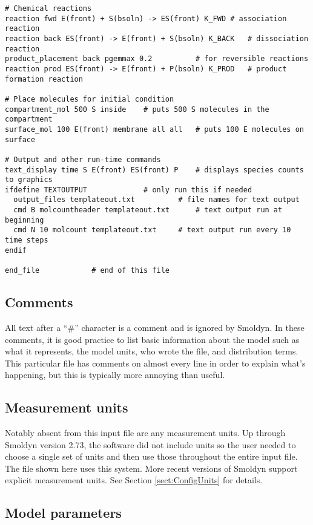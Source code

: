 \documentclass {scrbook}
\begin{document}
\begin{lstlisting}[style=SSAC]
# Chemical reactions
reaction fwd E(front) + S(bsoln) -> ES(front) K_FWD	# association reaction
reaction back ES(front) -> E(front) + S(bsoln) K_BACK 	# dissociation reaction
product_placement back pgemmax 0.2			# for reversible reactions
reaction prod ES(front) -> E(front) + P(bsoln) K_PROD	# product formation reaction

# Place molecules for initial condition
compartment_mol 500 S inside	# puts 500 S molecules in the compartment
surface_mol 100 E(front) membrane all all	# puts 100 E molecules on surface

# Output and other run-time commands
text_display time S E(front) ES(front) P	# displays species counts to graphics
ifdefine TEXTOUTPUT				# only run this if needed
  output_files templateout.txt			# file names for text output
  cmd B molcountheader templateout.txt		# text output run at beginning
  cmd N 10 molcount templateout.txt		# text output run every 10 time steps
endif

end_file			# end of this file
\end{lstlisting}

\subsection*{Comments}

All text after a ``\#'' character is a comment and is ignored by Smoldyn.  In these comments, it is good practice to list basic information about the model such as what it represents, the model units, who wrote the file, and distribution terms.  This particular file has comments on almost every line in order to explain what's happening, but this is typically more annoying than useful.

\subsection*{Measurement units}

Notably absent from this input file are any measurement units. Up through Smoldyn version 2.73, the software did not include units so the user needed to choose a single set of units and then use those throughout the entire input file. The file shown here uses this system. More recent versions of Smoldyn support explicit measurement units. See Section \ref{sect:ConfigUnits} for details.

\subsection*{Model parameters}
\end{document}
